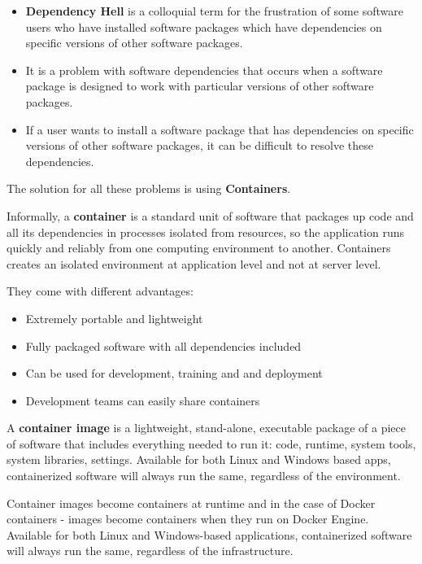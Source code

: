 \begin{warningblock}
    \begin{itemize}
        \item \textbf{Dependency Hell} is a colloquial term for the frustration of some software users who have installed software packages which have dependencies on specific versions of other software packages.
        \item It is a problem with software dependencies that occurs when a software package is designed to work with particular versions of other software packages.
        \item If a user wants to install a software package that has dependencies on specific versions of other software packages, it can be difficult to resolve these dependencies.
    \end{itemize}
\end{warningblock}

The solution for all these problems is using \textbf{Containers}.

\begin{definitionblock}[Container]
    Informally, a \textbf{container} is a standard unit of software
    that packages up code and all its
    dependencies in processes isolated from
    resources, so the application runs quickly
    and reliably from one computing
    environment to another. Containers creates an isolated
    environment at application level and
    not at server level.
\end{definitionblock}

\newpage
They come with different advantages:
\begin{itemize}
    \item Extremely portable and lightweight
    \item Fully packaged software with all dependencies included
    \item Can be used for development, training and and deployment
    \item Development teams can easily share containers
\end{itemize}

A \textbf{container image} is a lightweight, stand-alone, executable package of a piece of software that includes everything needed to run it: code, runtime, system tools, system libraries, settings. Available for both Linux and Windows based apps, containerized software will always run the same, regardless of the environment.

Container images become containers at runtime and in the case of Docker containers - images become containers when they run on Docker Engine. Available for both Linux and Windows-based applications, containerized software will always run the same, regardless of the infrastructure.   

